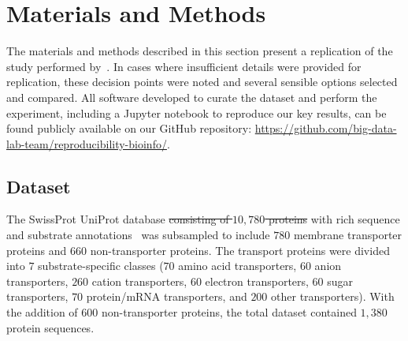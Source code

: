 \section{Materials and Methods}
\label{sec:materials}
The materials and methods described in this section present a replication of the study performed
by~\cite{mishra2014prediction}. In cases where insufficient details were provided for replication,
these decision points were noted and several sensible options selected and compared. All software 
developed to curate the dataset and perform the experiment, including a Jupyter notebook to reproduce our key results, can be found publicly available on
our GitHub repository: \url{https://github.com/big-data-lab-team/reproducibility-bioinfo/}.

\subsection{Dataset}
\label{sec:dataset}

The SwissProt UniProt database \sout{consisting of $10,780$ proteins} with rich sequence and substrate
annotations~\cite{boeckmann2003swiss} was subsampled to include $780$ membrane transporter proteins and $660$
non-transporter proteins. The transport proteins were divided into $7$ substrate-specific classes ($70$ amino acid
transporters, $60$ anion transporters, $260$ cation transporters, $60$ electron transporters, $60$ sugar
transporters, $70$ protein/mRNA transporters, and $200$ other transporters). With the addition of 600 non-transporter
proteins, the total dataset contained $1,380$ protein sequences. 

